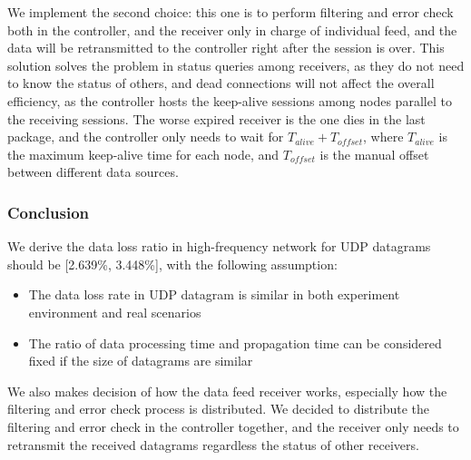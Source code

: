 \documentclass[11pt,openright,a4paper]{report}
\begin{document}
We implement the second choice: this one is to perform filtering and error check both in the controller, and the receiver only in charge of individual feed, and the data will be retransmitted to the controller right after the session is over. This solution solves the problem in status queries among receivers, as they do not need to know the status of others, and dead connections will not affect the overall efficiency, as the controller hosts the keep-alive sessions among nodes parallel to the receiving sessions. The worse expired receiver is the one dies in the last package, and the controller only needs to wait for $T_{alive}+T_{offset}$, where $T_{alive}$ is the maximum keep-alive time for each node, and $T_{offset}$ is the manual offset between different data sources.\\
\subsubsection{Conclusion}
We derive the data loss ratio in high-frequency network for UDP datagrams should be  [2.639\%, 3.448\%], with the following assumption:
\begin{itemize}
	\item The data loss rate in UDP datagram is similar in both experiment environment and real scenarios
	\item The ratio of data processing time and propagation time can be considered fixed if the size of datagrams are similar
\end{itemize}
We also makes decision of how the data feed receiver works, especially how the filtering and error check process is distributed. We decided to distribute the filtering and error check in the controller together, and the receiver only needs to retransmit the received datagrams regardless the status of other receivers.
\newpage
\end{document}
